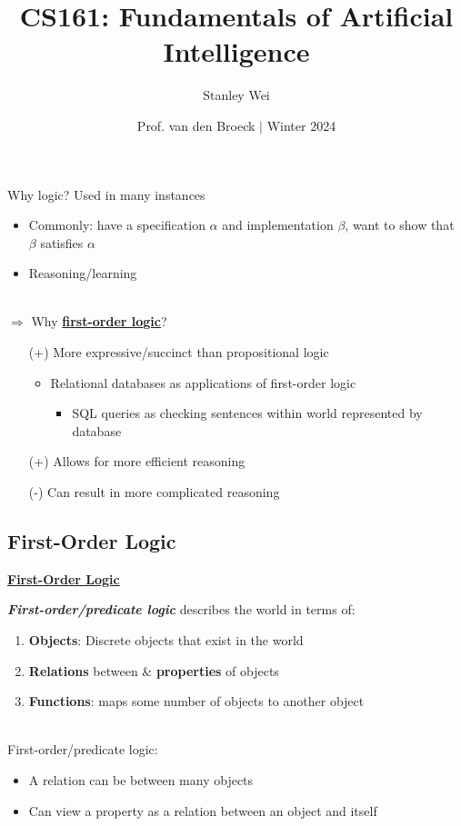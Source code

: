 \documentclass[12pt]{extarticle}
\title{CS161: Fundamentals of Artificial Intelligence}
\author{Stanley Wei}
\date{Prof. van den Broeck $\vert$ Winter 2024}
\theoremstyle{definition}
\theoremstyle{remark}
\newcommand{\pstart}[0]{\noindent}
\newcommand{\newp}[0]{~\\ \pstart}
\newcommand{\term}[1]{\noindent\textbf{\textit{#1}}}
\newcommand{\titleul}[1]{\noindent \textbf{\ul{#1}}}
\begin{document}
\pstart
Why logic? Used in many instances \begin{itemize}
    \item Commonly: have a specification $\alpha$ and implementation $\beta$, want to show that $\beta$ satisfies $\alpha$
    \item Reasoning/learning
\end{itemize}

\newp
$\Rightarrow$ Why \titleul{first-order logic}? \begin{itemize}
    \item[(+)] More expressive/succinct than propositional logic \begin{itemize}
        \item Relational databases as applications of first-order logic \begin{itemize}
            \item SQL queries as checking sentences within world represented by database
        \end{itemize}
    \end{itemize}
    \item[(+)] Allows for more efficient reasoning
    \item[(-)] Can result in more complicated reasoning
\end{itemize}

\subsection{First-Order Logic}
\vspace{3pt}
\begin{tcolorbox}[colback=orange!20!white]
    \titleul{First-Order Logic} \vspace{6pt}
    
    \term{First-order/predicate logic} describes the world in terms of: \begin{enumerate}
        \item \textbf{Objects}: Discrete objects that exist in the world
        \item \textbf{Relations} between \& \textbf{properties} of objects
        \item \textbf{Functions}: maps some number of objects to another object
    \end{enumerate}
\end{tcolorbox}

~\\ \pstart
First-order/predicate logic: \begin{itemize}
    \item A relation can be between many objects
    \item Can view a property as a relation between an object and itself
\end{itemize}
\end{document}
